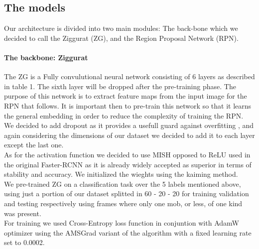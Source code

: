 \documentclass[10pt,journal,cspaper,compsoc]{IEEEtran}
\begin{document}
    
    \subsection{The models}
    Our architecture is divided into two main modules: The back-bone which we decided to call the Ziggurat (ZG), and the Region Proposal Network (RPN).\\
    \paragraph{The backbone: Ziggurat}
    The ZG  is a Fully convulutional neural network consisting of 6 layers as described in table 1. The sixth layer will be dropped after the pre-training phase. The purpose of this network is to extract feature maps from the input image for the RPN that follows. It is important then to pre-train this network so that it learns the general embedding in order 
    to reduce the complexity of training the RPN. We decided to add dropout as it provides a usefull guard against overfitting \cite{Srivastava:Dropout}, and again considering the dimensions of our dataset we decided to add it to each layer except the last one.\\ As for the activation function we decided to use MISH opposed to ReLU used in the original Faster-RCNN as it is already 
    widely accepted as superior in terms of stability and accuracy. We initialized the wieghts using the kaiming method. \cite{arxiv:Kaiming} \\ 
    We pre-trained ZG on a classification task over the 5 labels mentioned above,  using just a portion of our dataset splitted in 60 - 20 - 20 for training validation and testing respectively using frames where only one mob, or less,  of one kind was present.\\ For training we used Cross-Entropy loss function in conjuntion with AdamW optimizer using the AMSGrad variant of the algorithm with a 
    fixed learning rate set to 0.0002.
\end{document}
